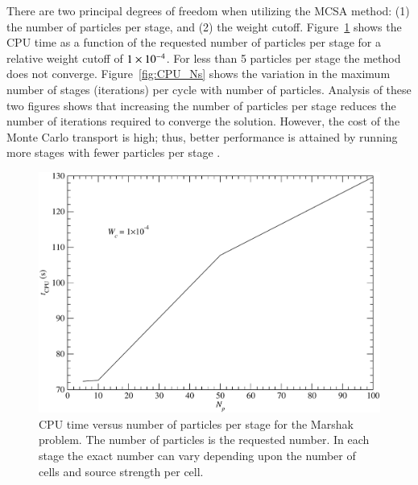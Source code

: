 \documentclass[preprint,12pt]{elsarticle}
\begin{document}
There are two principal degrees of freedom when utilizing the MCSA
method: (1) the number of particles per stage, and (2) the weight
cutoff.  Figure~\ref{fig:CPU_Np} shows the CPU time as a function of
the requested number of particles per stage for a relative weight
cutoff of $1\times 10^{-4}$.  For less than 5 particles per stage the
method does not converge.  Figure~\ref{fig:CPU_Ns} shows the variation
in the maximum number of stages (iterations) per cycle with number of
particles.  Analysis of these two figures shows that increasing the
number of particles per stage reduces the number of iterations
required to converge the solution.  However, the cost of the Monte
Carlo transport is high; thus, better performance is attained by
running more stages with fewer particles per stage \cite{evans_2003}.

\begin{figure}[h!]
  \centerline{ \includegraphics[width=5in,clip]{mrshk_np_CPU.pdf}}
  \caption{CPU time versus number of particles per stage for the
    Marshak problem.  The number of particles is the requested number.
    In each stage the exact number can vary depending upon the number
    of cells and source strength per cell.}
  \label{fig:CPU_Np}
\end{figure}
\end{document}
